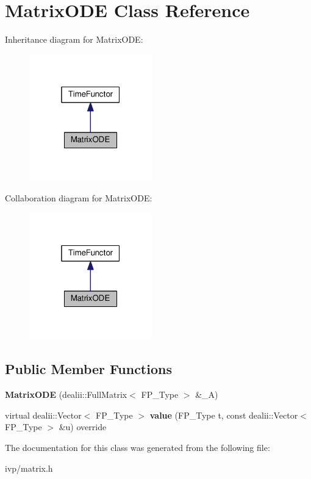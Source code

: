 \hypertarget{classMatrixODE}{}\section{Matrix\+O\+DE Class Reference}
\label{classMatrixODE}


Inheritance diagram for Matrix\+O\+DE\+:
\nopagebreak
\begin{figure}[H]
\begin{center}
\leavevmode
\includegraphics[width=151pt]{classMatrixODE__inherit__graph}
\end{center}
\end{figure}


Collaboration diagram for Matrix\+O\+DE\+:
\nopagebreak
\begin{figure}[H]
\begin{center}
\leavevmode
\includegraphics[width=151pt]{classMatrixODE__coll__graph}
\end{center}
\end{figure}
\subsection*{Public Member Functions}
\begin{DoxyCompactItemize}
\item 
\mbox{\label{classMatrixODE_a5281278faacc2c771902097b804a6651}} 
{\bfseries Matrix\+O\+DE} (dealii\+::\+Full\+Matrix$<$ F\+P\+\_\+\+Type $>$ \&\+\_\+A)
\item 
\mbox{\label{classMatrixODE_a7de8adc75b7d54e2d101a5c47f799896}} 
virtual dealii\+::\+Vector$<$ F\+P\+\_\+\+Type $>$ {\bfseries value} (F\+P\+\_\+\+Type t, const dealii\+::\+Vector$<$ F\+P\+\_\+\+Type $>$ \&u) override
\end{DoxyCompactItemize}


The documentation for this class was generated from the following file\+:\begin{DoxyCompactItemize}
\item 
ivp/matrix.\+h\end{DoxyCompactItemize}
